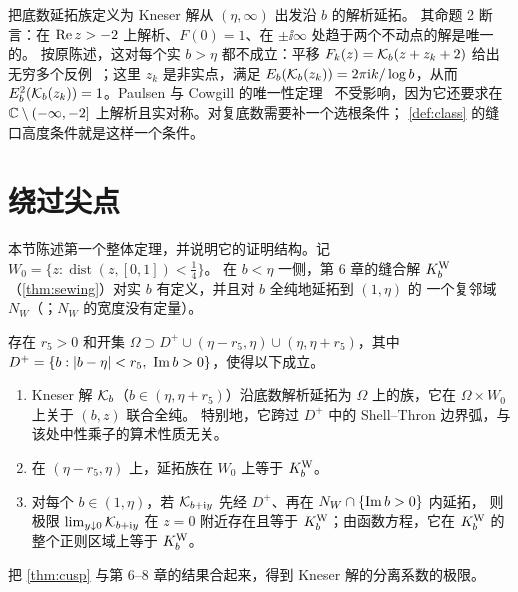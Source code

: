 \begin{remark}\label{ch10:rem:paulsen}
\cite{Paulsen2019} 把底数延拓族定义为 Kneser 解从 $(\eta,\infty)$ 出发沿 $b$ 的解析延拓。
其命题 2 断言：在 $\operatorname{Re} z>-2$ 上解析、$F(0)=1$、在 $\pm\ii\infty$ 处趋于两个不动点的解是唯一的。
按原陈述，这对每个实 $b>\eta$ 都不成立：平移 $F_k(z)=\mathcal K_b(z+z_k+2)$
给出无穷多个反例~\cite[注~1.2]{KneserPaper}；这里 $z_k$ 是非实点，满足 $E_b(\mathcal K_b(z_k))=2\pi\mathrm{i} k/\log b$，从而 $E_b^2(\mathcal K_b(z_k))=1$。Paulsen 与 Cowgill 的唯一性定理~\cite{PaulsenCowgill2017}
不受影响，因为它还要求在 $\mathbb{C}\setminus(-\infty,-2]$ 上解析且实对称。对复底数需要补一个选根条件；
\cref{def:class} 的缝口高度条件就是这样一个条件。
\end{remark}

\section{绕过尖点}\label{ch10:sec:cusp}

本节陈述第一个整体定理，并说明它的证明结构。记 $W_0=\{z:\operatorname{dist}(z,[0,1])<\tfrac14\}$。
在 $b<\eta$ 一侧，第 6 章的缝合解 $K^{\mathrm W}_b$（\cref{thm:sewing}）对实 $b$ 有定义，并且对 $b$ 全纯地延拓到 $(1,\eta)$ 的
一个复邻域 $N_W$（\cite[命题~3.5]{KneserPaper}；$N_W$ 的宽度没有定量）。

\begin{theorem}\label{thm:cusp}
存在 $r_5>0$ 和开集 $\Omega\supset D^+\cup(\eta-r_5,\eta)\cup(\eta,\eta+r_5)$，其中
$D^+=\{b:|b-\eta|<r_5,\ \operatorname{Im} b>0\}$，使得以下成立。
\begin{enumerate}
\item Kneser 解 $\mathcal K_b$（$b\in(\eta,\eta+r_5)$）沿底数解析延拓为 $\Omega$ 上的族，它在 $\Omega\times W_0$ 上关于 $(b,z)$ 联合全纯。
  特别地，它跨过 $D^+$ 中的 Shell--Thron 边界弧，与该处中性乘子的算术性质无关。
\item 在 $(\eta-r_5,\eta)$ 上，延拓族在 $W_0$ 上等于 $K^{\mathrm W}_b$。
\item 对每个 $b\in(1,\eta)$，若 $\mathcal K_{b+\mathrm{i} y}$ 先经 $D^+$、再在 $N_W\cap\{\operatorname{Im} b>0\}$ 内延拓，
  则极限 $\lim_{y\downarrow0}\mathcal K_{b+\mathrm{i} y}$ 在 $z=0$ 附近存在且等于 $K^{\mathrm W}_b$；由函数方程，它在 $K^{\mathrm W}_b$ 的整个正则区域上等于 $K^{\mathrm W}_b$。
\end{enumerate}
\end{theorem}

把 \cref{thm:cusp} 与第 6--8 章的结果合起来，得到 Kneser 解的分离系数的极限。

